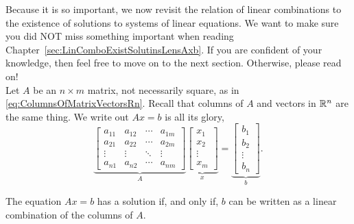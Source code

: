 Because it is so important, we now revisit the relation of linear combinations to the existence of solutions to systems of linear equations. We want to make sure you did NOT miss something important when reading Chapter~\ref{sec:LinComboExistSolutinsLensAxb}. If you are confident of your knowledge, then feel free to move on to the next section. Otherwise, please read on!\\

Let $A$ be an $n \times m$ matrix, not necessarily square, as in \eqref{eq:ColumnsOfMatrixVectorsRn}. Recall that columns of $A$ and vectors in $\mathbb R^n$ are the same thing. We write out $Ax=b$ is all its glory, 
\begin{equation}
\label{eq:ExistenceSolutionsNonsquare}    
 \underbrace{\left[\begin{array}{cccc} a_{11}& a_{12}& \cdots & a_{1m} \\
 a_{21}& a_{22}& \cdots & a_{2m}  \\
 \vdots & \vdots&  \ddots & \vdots \\
 a_{n1}& a_{n2}& \cdots & a_{nm} 
 \end{array}\right] }_{A} \underbrace{\left[ \begin{array}{c} x_1 \\ x_2 \\
\vdots \\ x_m   \end{array} \right]}_{x} = \underbrace{\left[ \begin{array}{c} b_1 \\ b_2 \\ \vdots \\ b_n  \end{array} \right]}_{b}.
\end{equation}

\vspace*{.5cm}
\begin{tcolorbox}[sharp corners, colback=green!30, colframe=green!80!blue, title=\textbf{\large Existence of Solutions}] 
The equation $Ax=b$ has a solution if, and only if, $b$ can be written as a linear combination of the columns of $A$.
\end{tcolorbox}

